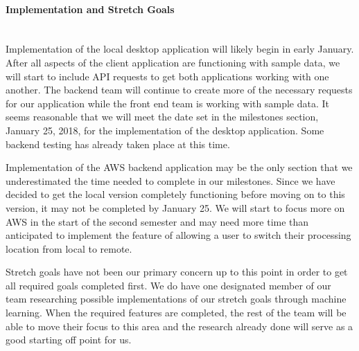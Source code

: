 \paragraph{Implementation and Stretch Goals} \mbox{}\\[\paragraphheaderspace]
Implementation of the local desktop application will likely begin in early January. After all aspects of the client application are functioning with sample data, we will start to include API requests to get both applications working with one another. The backend team will continue to create more of the necessary requests for our application while the front end team is working with sample data. It seems reasonable that we will meet the date set in the milestones section, January 25, 2018, for the implementation of the desktop application. Some backend testing has already taken place at this time.\par
Implementation of the AWS backend application may be the only section that we underestimated the time needed to complete in our milestones. Since we have decided to get the local version completely functioning before moving on to this version, it may not be completed by January 25. We will start to focus more on AWS in the start of the second semester and may need more time than anticipated to implement the feature of allowing a user to switch their processing location from local to remote.\par
Stretch goals have not been our primary concern up to this point in order to get all required goals completed first. We do have one designated member of our team researching possible implementations of our stretch goals through machine learning. When the required features are completed, the rest of the team will be able to move their focus to this area and the research already done will serve as a good starting off point for us.\par
